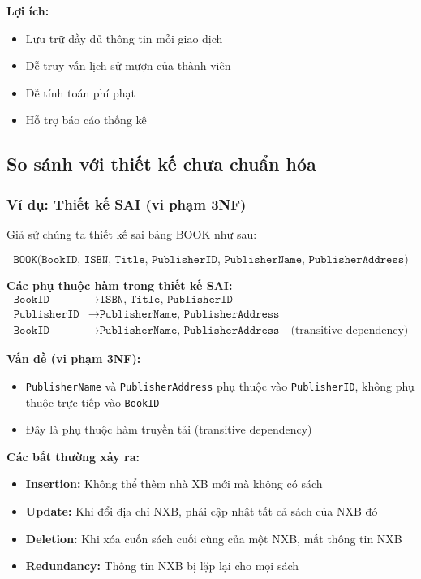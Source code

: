 \documentclass[12pt,a4paper]{article}
\begin{document}
\textbf{Lợi ích:}
\begin{itemize}
    \item Lưu trữ đầy đủ thông tin mỗi giao dịch
    \item Dễ truy vấn lịch sử mượn của thành viên
    \item Dễ tính toán phí phạt
    \item Hỗ trợ báo cáo thống kê
\end{itemize}

\subsection{So sánh với thiết kế chưa chuẩn hóa}

\subsubsection{Ví dụ: Thiết kế SAI (vi phạm 3NF)}

Giả sử chúng ta thiết kế sai bảng BOOK như sau:

$$ \texttt{BOOK(BookID, ISBN, Title, PublisherID, PublisherName, PublisherAddress)} $$

\textbf{Các phụ thuộc hàm trong thiết kế SAI:}
\begin{align*}
\texttt{BookID} &\rightarrow \texttt{ISBN, Title, PublisherID} \\
\texttt{PublisherID} &\rightarrow \texttt{PublisherName, PublisherAddress} \\
\texttt{BookID} &\rightarrow \texttt{PublisherName, PublisherAddress} \quad \text{(transitive dependency)}
\end{align*}

\textbf{Vấn đề (vi phạm 3NF):}
\begin{itemize}
    \item \texttt{PublisherName} và \texttt{PublisherAddress} phụ thuộc vào \texttt{PublisherID}, không phụ thuộc trực tiếp vào \texttt{BookID}
    \item Đây là phụ thuộc hàm truyền tải (transitive dependency)
\end{itemize}

\textbf{Các bất thường xảy ra:}
\begin{itemize}
    \item \textbf{Insertion:} Không thể thêm nhà XB mới mà không có sách
    \item \textbf{Update:} Khi đổi địa chỉ NXB, phải cập nhật tất cả sách của NXB đó
    \item \textbf{Deletion:} Khi xóa cuốn sách cuối cùng của một NXB, mất thông tin NXB
    \item \textbf{Redundancy:} Thông tin NXB bị lặp lại cho mọi sách
\end{itemize}
\end{document}
